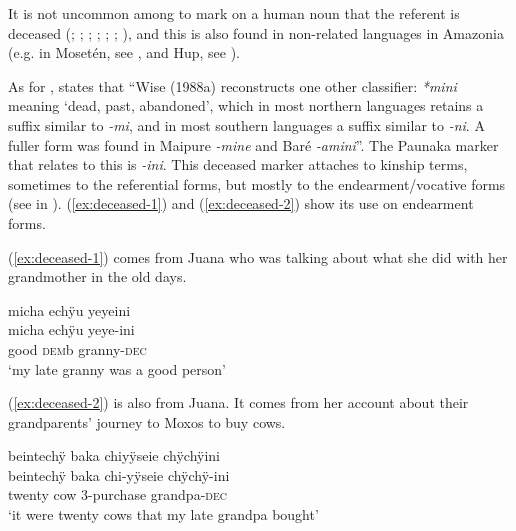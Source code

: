 It is not uncommon among  to mark on a human noun that the referent is deceased (\citealp[cf.][130, 276, 313]{Ramirez2001}; %
\citealt[153, 157]{OlzaZubiri2004}; \citealt[115]{Danielsen2007}; \citealt[289]{Brandao2014}; \citealt[35]{Jorda2014}; \citealt[80, 81]{Rose2014a}; \citealt[356]{Mihas2015}), and this is also found in non-related languages in Amazonia (e.g. in Mosetén, see \citealt[75]{Sakel2004}, and Hup, see \citealt[353]{Epps2008}). 

As for , \citet[382]{Payne1991} states that “Wise (1988a) reconstructs one other classifier: \textit{*mini} meaning ‘dead, past, abandoned’, which in most northern languages retains a suffix similar to \textit{-mi}, and in most southern languages a suffix similar to \textit{-ni}. A fuller form was found in Maipure \textit{-mine} and Baré \textit{-amini}”. The Paunaka marker that relates to this is \textit{-ini}. This deceased marker attaches to kinship terms, sometimes to the referential forms, but mostly to the endearment/vocative forms (see  in ). (\ref{ex:deceased-1}) and (\ref{ex:deceased-2}) show its use on endearment forms. 

(\ref{ex:deceased-1}) comes from Juana who was talking about what she did with her grandmother in the old days.

\ea\label{ex:deceased-1}
\begingl
\glpreamble micha echÿu yeyeini\\
\gla micha echÿu yeye-ini\\
\glb good \textsc{dem}b granny-\textsc{dec}\\
\glft ‘my late granny was a good person’
\endgl
\trailingcitation{[jxx-p120430l-1.059]}
\xe

(\ref{ex:deceased-2}) is also from Juana. It comes from her account about their grandparents’ journey to Moxos to buy cows.

\ea\label{ex:deceased-2}
\begingl 
\glpreamble beintechÿ baka chiyÿseie chÿchÿini\\
\gla beintechÿ baka chi-yÿseie chÿchÿ-ini\\ 
\glb twenty cow 3-purchase grandpa-\textsc{dec}\\ 
\glft ‘it were twenty cows that my late grandpa bought’
\trailingcitation{[jxx-p151016l-2.081-083]}
\xe
{} 


